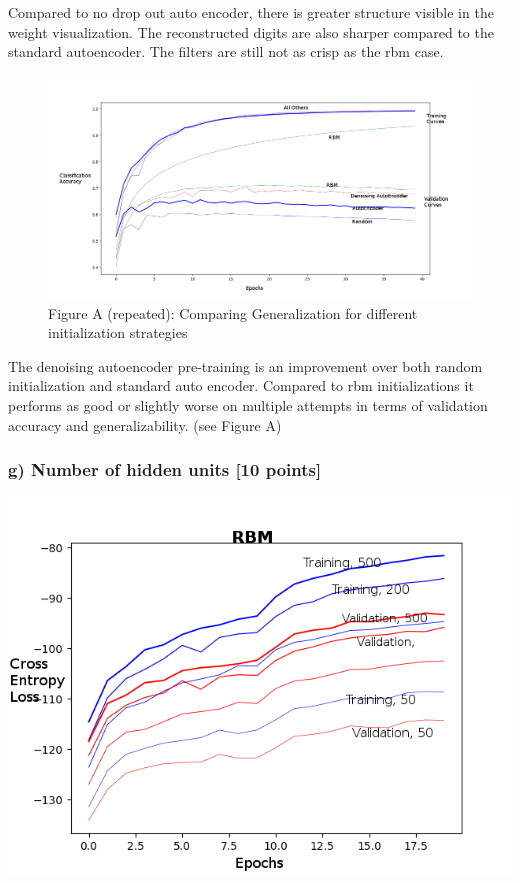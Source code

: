 \documentclass[10pt]{article}
\begin{document}
Compared to no drop out auto encoder, there is greater structure visible in the weight visualization. The reconstructed digits are also sharper compared to the standard autoencoder. The filters are still not as crisp as the rbm case.

\begin{figure}
  \caption{Figure A (repeated): Comparing Generalization for different initialization strategies}
  \includegraphics[scale=0.4]{classification_initialization_experiment_v1.png}
\end{figure}

The denoising autoencoder pre-training is an improvement over both random initialization and standard auto encoder. Compared to rbm initializations it performs as good or slightly worse on multiple attempts in terms of validation accuracy and generalizability. (see Figure A)


\subsubsection*{g) Number of hidden units [10 points]}

\includegraphics[scale=0.6]{rbm_hu_experiment.png}
\end{document}
